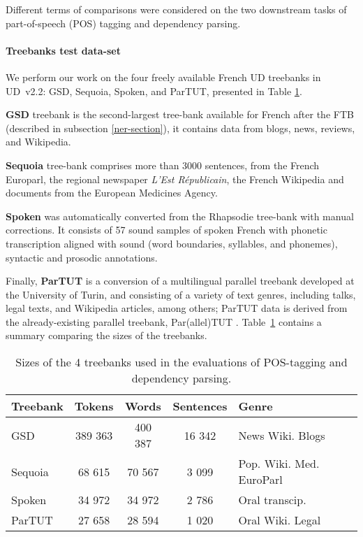 Different terms of comparisons were considered on the two downstream tasks of part-of-speech (POS) tagging and dependency parsing.
\paragraph{Treebanks test data-set}
We perform our work on the four freely available French UD treebanks in UD~v2.2: GSD, Sequoia, Spoken, and ParTUT, presented in Table \ref{treebanks-tab-cabernet}.

\textbf{GSD} treebank \citep{mcdonald-etal-2013-universal} is the second-largest tree-bank available for French after the FTB (described in subsection \ref{ner-section}), it contains data from blogs, news, reviews, and Wikipedia.

\textbf{Sequoia} tree-bank %
\citep{candito-etal-2014-deep} comprises more than 3000 sentences, from the French Europarl, the regional newspaper \emph{L’Est Républicain}, the French Wikipedia and documents from the European Medicines Agency.

\textbf{Spoken} was automatically converted from the Rhapsodie tree-bank  %
\citep{lacheret-etal-2014-rhapsodie} with manual corrections. It consists of 57 sound samples of spoken French with phonetic transcription aligned with sound (word boundaries, syllables, and phonemes), syntactic and prosodic annotations.

Finally, \textbf{ParTUT} is a conversion of a multilingual parallel treebank developed at the University of Turin, and consisting of a variety of text genres, including talks, legal texts, and Wikipedia articles, among others; ParTUT data is derived from the already-existing parallel treebank, Par(allel)TUT \citep{sanguinetti-Bosco-2015-parttut}. Table~\ref{treebanks-tab-cabernet} contains a summary comparing the sizes of the treebanks.%

\begin{table}
    \centering
        \begin{tabular}{lcccl}
            \toprule
            Treebank & Tokens  & Words   & Sentences & Genre                    \\
            \midrule
            GSD      & 389 363 & 400 387 & 16 342    & News Wiki. Blogs         \\
            Sequoia  & 68 615  & 70 567  & 3 099     & Pop. Wiki. Med. EuroParl \\
            Spoken   & 34 972  & 34 972  & 2 786     & Oral transcip.           \\
            ParTUT   & 27 658  & 28 594  & 1 020     & Oral Wiki. Legal         \\
            \bottomrule
        \end{tabular}
    \caption{Sizes of the 4 treebanks used in the evaluations of POS-tagging and dependency parsing. \label{treebanks-tab-cabernet}}
\end{table}

